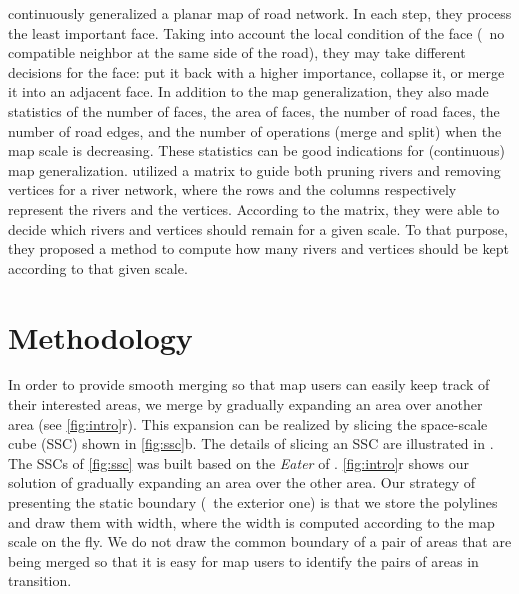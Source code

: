 \documentclass[]{interact}
\begin{document}
\citet{Suba2016Road} continuously generalized a planar map of road network.
In each step, they process the least important face.
Taking into account the local condition of the face
(\eg~no compatible neighbor at the same side of the road),
they may take different decisions for the face: 
put it back with a higher importance, collapse it, 
or merge it into an adjacent face.
In addition to the map generalization, 
they also made statistics of the number of faces,
the area of faces, the number of road faces, the number of road edges,
and the number of operations (merge and split) 
when the map scale is decreasing.
These statistics can be good indications 
for (continuous) map generalization.
\citet{Huang2017Matrix} utilized a matrix to guide 
both pruning rivers and removing vertices for a river network, 
where the rows and the columns respectively represent
the rivers and the vertices.
According to the matrix, 
they were able to decide which rivers and vertices 
should remain for a given scale.
To that purpose, they proposed a method 
to compute how many rivers and vertices 
should be kept according to that given scale.






%


\section{Methodology}
\label{sec:methodology}


In order to provide smooth merging
so that map users can easily keep track of their interested areas,
we merge by gradually expanding an area over another area
(see \fig\ref{fig:intro}r).
This expansion can be realized 
by slicing the space-scale cube (SSC) shown in
\fig\ref{fig:ssc}b.
The details of slicing an SSC are illustrated in \citet{Meijers2020Web}.
The SSCs of \fig\ref{fig:ssc} was built 
based on the \emph{Eater} of \citet{Suba2014Merge}.
\fig\ref{fig:intro}r shows our solution of
gradually expanding an area over the other area.
Our strategy of presenting the static boundary (\ie~the exterior one) 
is that we store the polylines and 
draw them with width, 
where the width is computed according to the map scale on the fly.
We do not draw the common boundary of 
a pair of areas that are being merged
so that it is easy for map users 
to identify the pairs of areas in transition. 
\end{document}

